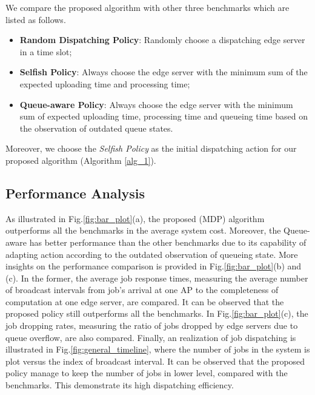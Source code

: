 We compare the proposed algorithm with other three benchmarks which are listed as follows.
\begin{itemize}
    \item \textbf{Random Dispatching Policy}:
            Randomly choose a dispatching edge server in a time slot; 
    \item \textbf{Selfish Policy}:
            Always choose the edge server with the minimum sum of the expected uploading time and processing time;
    \item \textbf{Queue-aware Policy}:
            Always choose the edge server with the minimum sum of expected uploading time, processing time and queueing time based on the observation of outdated queue states.
\end{itemize}
Moreover, we choose the \emph{Selfish Policy} as the initial dispatching action for our proposed algorithm (Algorithm \ref{alg_1}).
\subsection{Performance Analysis}
\label{subsec:basic}
As illustrated in Fig.\ref{fig:bar_plot}(a), the proposed (MDP) algorithm outperforms all the benchmarks in the average system cost.
Moreover, the Queue-aware has better performance than the other benchmarks due to its capability of adapting action according to the outdated observation of queueing state.
More insights on the performance comparison is provided in Fig.\ref{fig:bar_plot}(b) and (c).
In the former, the average job response times, measuring the average number of broadcast intervals from job's arrival at one AP to the completeness of computation at one edge server, are compared.
It can be observed that the proposed policy still outperforms all the benchmarks.
In Fig.\ref{fig:bar_plot}(c), the job dropping rates, measuring the ratio of jobs dropped by edge servers due to queue overflow, are also compared.
Finally, an realization of job dispatching is illustrated in Fig.\ref{fig:general_timeline}, where the number of jobs in the system is plot versus the index of broadcast interval.
It can be observed that the proposed policy manage to keep the number of jobs in lower level, compared with the benchmarks.
This demonstrate its high dispatching efficiency.

